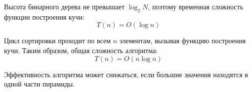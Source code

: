 \documentclass[otchet]{SCWorks}
\begin{document}
Высота бинарного дерева не превышает $\log_2 N$, поэтому временная сложность функции построения кучи:
$$
T(n) = O(\log n)
$$

Цикл сортировки проходит по всем $n$ элементам, вызывая функцию построения кучи. Таким образом, общая сложность алгоритма:
$$
T(n) = O(n \log n)
$$

Эффективность алгоритма может снижаться, если большие значения находятся в одной части пирамиды.


	


\appendix
\end{document}
